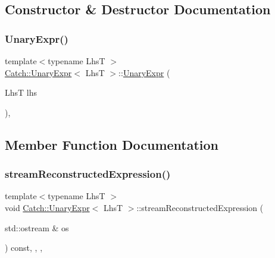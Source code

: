 \subsection{Constructor \& Destructor Documentation}
\mbox{\label{class_catch_1_1_unary_expr_ae02f666a1e64da728628aa2033e1d6e7}} 
\subsubsection{\texorpdfstring{UnaryExpr()}{UnaryExpr()}}
{\footnotesize\ttfamily template$<$typename LhsT $>$ \\
\mbox{\hyperlink{class_catch_1_1_unary_expr}{Catch\+::\+Unary\+Expr}}$<$ LhsT $>$\+::\mbox{\hyperlink{class_catch_1_1_unary_expr}{Unary\+Expr}} (\begin{DoxyParamCaption}\item[{LhsT}]{lhs }\end{DoxyParamCaption})\hspace{0.3cm}{\ttfamily [inline]}, {\ttfamily [explicit]}}



\subsection{Member Function Documentation}
\mbox{\label{class_catch_1_1_unary_expr_aaabf30455a996c80675c0f388a6e4110}} 
\subsubsection{\texorpdfstring{streamReconstructedExpression()}{streamReconstructedExpression()}}
{\footnotesize\ttfamily template$<$typename LhsT $>$ \\
void \mbox{\hyperlink{class_catch_1_1_unary_expr}{Catch\+::\+Unary\+Expr}}$<$ LhsT $>$\+::stream\+Reconstructed\+Expression (\begin{DoxyParamCaption}\item[{std\+::ostream \&}]{os }\end{DoxyParamCaption}) const\hspace{0.3cm}{\ttfamily [inline]}, {\ttfamily [override]}, {\ttfamily [private]}, {\ttfamily [virtual]}}



